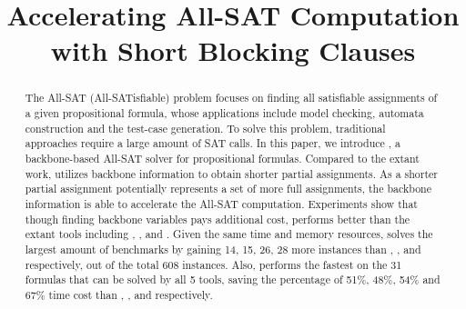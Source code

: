 \documentclass{article}
\begin{document}
\title{Accelerating All-SAT Computation with Short Blocking Clauses }
\maketitle
\begin{abstract}
The All-SAT (All-SATisfiable) problem focuses on finding all satisfiable assignments of a given propositional formula, whose applications include model checking, automata construction and the test-case generation. To solve this problem, traditional approaches require a large amount of SAT calls.
In this paper, we introduce \tool, a backbone-based All-SAT solver for propositional formulas. Compared to the extant work, \tool utilizes backbone information to obtain shorter partial assignments. As a shorter partial assignment potentially represents a set of more full assignments, the backbone information is able to accelerate the All-SAT computation. 
Experiments show that though finding backbone variables pays additional cost, \tool performs better than the extant tools including \ctool, \bc, \nbc and \bdd.
Given the same time and memory resources, \tool solves the largest amount of benchmarks by gaining 14, 15, 26, 28 more instances than \ctool, \bc, \nbc and \bdd respectively, out of the total 608 instances.
Also, \tool performs the fastest on the 31 formulas that can be solved by all 5 tools, saving the percentage of 51\%, 48\%, 54\% and 67\% time cost than \ctool, \bc, \nbc and \bdd respectively.
\end{abstract}








\end{document}
